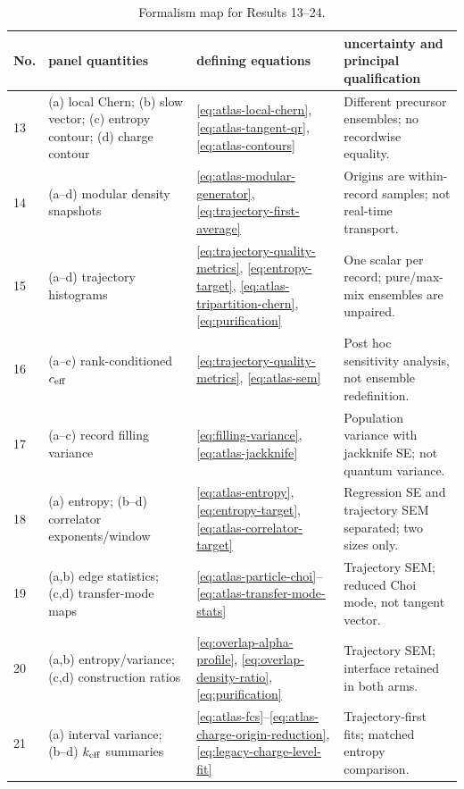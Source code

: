 \documentclass[aps,prb,twocolumn,floatfix,nofootinbib,superscriptaddress]{revtex4-2}
\begin{document}
\begin{table}[!t]
\centering
\caption{\label{tab:formalism-map-b}Formalism map for Results 13--24.}
\footnotesize
\setlength{\tabcolsep}{3.2pt}
\renewcommand{\arraystretch}{1.08}
\begin{tabularx}{\textwidth}{p{}p{}Xp{}}
\toprule
No. & panel quantities & defining equations & uncertainty and principal qualification\\
\midrule
13 & (a) local Chern; (b) slow vector; (c) entropy contour; (d) charge contour
& \eqref{eq:atlas-local-chern}, \eqref{eq:atlas-tangent-qr},
\eqref{eq:atlas-contours}
& Different precursor ensembles; no recordwise equality.\\
14 & (a--d) modular density snapshots
& \eqref{eq:atlas-modular-generator}, \eqref{eq:trajectory-first-average}
& Origins are within-record samples; not real-time transport.\\
15 & (a--d) trajectory histograms
& \eqref{eq:trajectory-quality-metrics}, \eqref{eq:entropy-target},
\eqref{eq:atlas-tripartition-chern}, \eqref{eq:purification}
& One scalar per record; pure/max-mix ensembles are unpaired.\\
16 & (a--c) rank-conditioned $c_{\rm eff}$
& \eqref{eq:trajectory-quality-metrics}, \eqref{eq:atlas-sem}
& Post hoc sensitivity analysis, not ensemble redefinition.\\
17 & (a--c) record filling variance
& \eqref{eq:filling-variance}, \eqref{eq:atlas-jackknife}
& Population variance with jackknife SE; not quantum variance.\\
18 & (a) entropy; (b--d) correlator exponents/window
& \eqref{eq:atlas-entropy}, \eqref{eq:entropy-target},
\eqref{eq:atlas-correlator-target}
& Regression SE and trajectory SEM separated; two sizes only.\\
19 & (a,b) edge statistics; (c,d) transfer-mode maps
& \eqref{eq:atlas-particle-choi}--\eqref{eq:atlas-transfer-mode-stats}
& Trajectory SEM; reduced Choi mode, not tangent vector.\\
20 & (a,b) entropy/variance; (c,d) construction ratios
& \eqref{eq:overlap-alpha-profile}, \eqref{eq:overlap-density-ratio},
\eqref{eq:purification}
& Trajectory SEM; interface retained in both arms.\\
21 & (a) interval variance; (b--d) $k_{\rm eff}$ summaries
& \eqref{eq:atlas-fcs}--\eqref{eq:atlas-charge-origin-reduction},
\eqref{eq:legacy-charge-level-fit}
& Trajectory-first fits; matched entropy comparison.\\

\end{tabularx}
\end{table}
\end{document}
